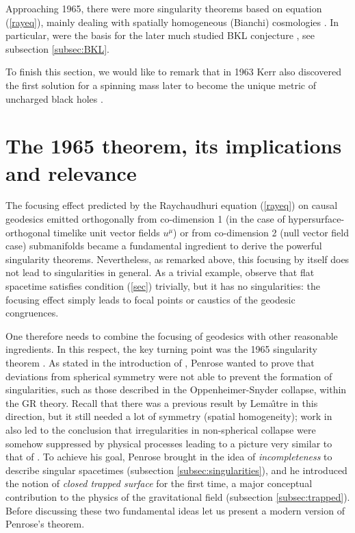 \documentclass[12pt]{iopart}
\begin{document}
Approaching 1965, there were more singularity theorems based on equation (\ref{rayeq}), mainly dealing with spatially homogeneous (Bianchi) cosmologies \cite{Sh0,HE2,LK,LK1}. In particular, \cite{LK,LK1} were the basis for the later much studied BKL conjecture \cite{BKL,BKL1}, see subsection \ref{subsec:BKL}.

To finish this section, we would like to remark that 
in 1963 Kerr also discovered the first solution for a spinning mass \cite{Kerr} later to become the unique metric of uncharged black holes \cite{Rob,Heus}.

\section{The 1965 theorem, its implications and relevance}\label{sec:theorem}
The focusing effect predicted by the Raychaudhuri equation (\ref{rayeq}) on causal geodesics emitted orthogonally from co-dimension 1 (in the case of hypersurface-orthogonal timelike unit vector fields $u^\mu$) or from co-dimension 2 (null vector field case) submanifolds became a fundamental ingredient to derive the 
powerful singularity theorems. Nevertheless, as remarked above, this 
focusing by itself does not lead to singularities in general. As a 
trivial example, observe that flat spacetime satisfies condition 
(\ref{sec}) trivially, but it has no singularities: the focusing 
effect simply leads to focal points or caustics of the geodesic 
congruences. 

One therefore needs to combine the focusing of geodesics with other reasonable ingredients. In this respect, the key turning point was the 1965 singularity theorem \cite{P}. As stated in the introduction of \cite{P}, Penrose wanted to prove that deviations from spherical symmetry were not able to prevent the formation of singularities, such as those described in the Oppenheimer-Snyder collapse, within the GR theory. Recall that there was a previous result by Lema\^\i tre  in this direction, but it still needed a lot of symmetry (spatial homogeneity); work in \cite{DZN} also led to the conclusion that irregularities in non-spherical collapse were somehow suppressed by physical processes leading to a picture very similar to that of \cite{OS}. To achieve his goal, Penrose brought in the idea of {\em incompleteness} to describe singular spacetimes (subsection \ref{subsec:singularities}), and he introduced the notion of {\em closed trapped surface} for the first time, a major conceptual contribution to the physics of the gravitational field (subsection \ref{subsec:trapped}). Before discussing  these two fundamental ideas  let us present a modern version of Penrose's theorem.
\end{document}

